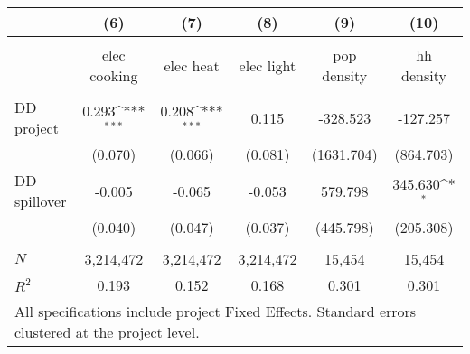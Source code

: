 {
\def\sym#1{\ifmmode^{#1}\else\(^{#1}\)\fi}
\begin{tabular}{l*{5}{c}}
 & (6) & (7) & (8) & (9) & (10)  \\[0.2em]
\hline\\[-0.9em]

             & elec cooking & elec heat  & elec light & pop density   & hh density \\
[0.2em]\hline \\[-0.9em]

DD project   & 0.293\sym{***} & 0.208\sym{***} &  0.115      & -328.523 &  -127.257 \\
             & (0.070)        & (0.066)        &  (0.081)    &(1631.704)&  (864.703)\\
[0.5em]
DD spillover & -0.005         & -0.065         &  -0.053     & 579.798  &  345.630\sym{*} \\
             & (0.040)        & (0.047)        &  (0.037)    &(445.798) &  (205.308)     \\

\hline \\[-0.9em] 

\(N\)        & 3,214,472     &  3,214,472     &  3,214,472  &  15,454   &   15,454  \\
\(R^{2}\)    & 0.193         &    0.152       &    0.168    &  0.301    &    0.301    \\
\hline
\multicolumn{6}{l}{\tiny All specifications include project Fixed Effects. Standard errors clustered at the project level. }
\end{tabular}
}
